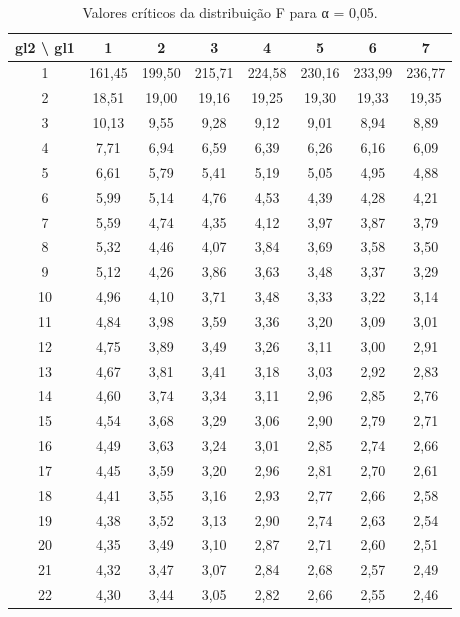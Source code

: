 \documentclass[
]{book}
\begin{document}
\begin{table}

\caption{\label{tab:rec-f}Valores críticos da distribuição F para α = 0,05.}
\centering
\begin{tabular}[t]{c|c|c|c|c|c|c|c}
\hline
gl2 \textbackslash{} gl1 & 1 & 2 & 3 & 4 & 5 & 6 & 7\\
\hline
1 & 161,45 & 199,50 & 215,71 & 224,58 & 230,16 & 233,99 & 236,77\\
\hline
2 & 18,51 & 19,00 & 19,16 & 19,25 & 19,30 & 19,33 & 19,35\\
\hline
3 & 10,13 & 9,55 & 9,28 & 9,12 & 9,01 & 8,94 & 8,89\\
\hline
4 & 7,71 & 6,94 & 6,59 & 6,39 & 6,26 & 6,16 & 6,09\\
\hline
5 & 6,61 & 5,79 & 5,41 & 5,19 & 5,05 & 4,95 & 4,88\\
\hline
6 & 5,99 & 5,14 & 4,76 & 4,53 & 4,39 & 4,28 & 4,21\\
\hline
7 & 5,59 & 4,74 & 4,35 & 4,12 & 3,97 & 3,87 & 3,79\\
\hline
8 & 5,32 & 4,46 & 4,07 & 3,84 & 3,69 & 3,58 & 3,50\\
\hline
9 & 5,12 & 4,26 & 3,86 & 3,63 & 3,48 & 3,37 & 3,29\\
\hline
10 & 4,96 & 4,10 & 3,71 & 3,48 & 3,33 & 3,22 & 3,14\\
\hline
11 & 4,84 & 3,98 & 3,59 & 3,36 & 3,20 & 3,09 & 3,01\\
\hline
12 & 4,75 & 3,89 & 3,49 & 3,26 & 3,11 & 3,00 & 2,91\\
\hline
13 & 4,67 & 3,81 & 3,41 & 3,18 & 3,03 & 2,92 & 2,83\\
\hline
14 & 4,60 & 3,74 & 3,34 & 3,11 & 2,96 & 2,85 & 2,76\\
\hline
15 & 4,54 & 3,68 & 3,29 & 3,06 & 2,90 & 2,79 & 2,71\\
\hline
16 & 4,49 & 3,63 & 3,24 & 3,01 & 2,85 & 2,74 & 2,66\\
\hline
17 & 4,45 & 3,59 & 3,20 & 2,96 & 2,81 & 2,70 & 2,61\\
\hline
18 & 4,41 & 3,55 & 3,16 & 2,93 & 2,77 & 2,66 & 2,58\\
\hline
19 & 4,38 & 3,52 & 3,13 & 2,90 & 2,74 & 2,63 & 2,54\\
\hline
20 & 4,35 & 3,49 & 3,10 & 2,87 & 2,71 & 2,60 & 2,51\\
\hline
21 & 4,32 & 3,47 & 3,07 & 2,84 & 2,68 & 2,57 & 2,49\\
\hline
22 & 4,30 & 3,44 & 3,05 & 2,82 & 2,66 & 2,55 & 2,46\\
\hline

\end{tabular}
\end{table}
\end{document}
